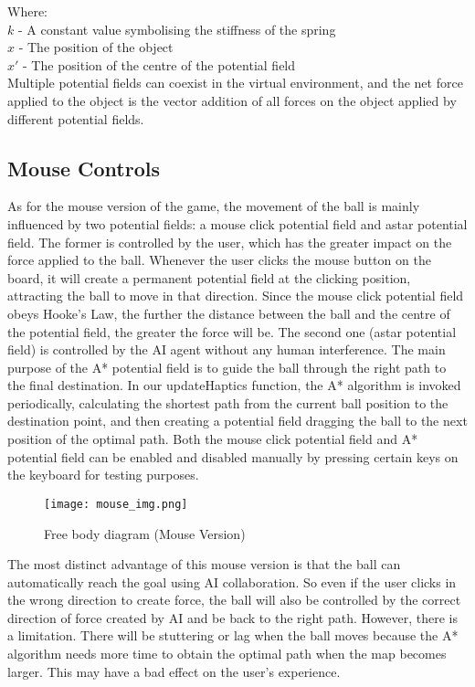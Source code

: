 \documentclass[a4paper]{article}
\begin{document}
\noindent Where: \\
    $k$  - A constant value symbolising the stiffness of the spring\\
    $x$  - The position of the object \\
    $x'$ - The position of the centre of the potential field \\

Multiple potential fields can coexist in the virtual environment, and the net force applied to the object is the vector addition of all forces on the object applied by different potential fields.

\subsection{Mouse Controls}
As for the mouse version of the game, the movement of the ball is mainly influenced by two potential fields: a mouse click potential field and astar potential field. The former is controlled by the user, which has the greater impact on the force applied to the ball. Whenever the user clicks the mouse button on the board, it will create a permanent potential field at the clicking position, attracting the ball to move in that direction. Since the mouse click potential field obeys Hooke’s Law, the further the distance between the ball and the centre of the potential field, the greater the force will be. The second one (astar potential field) is controlled by the AI agent without any human interference. The main purpose of the A* potential field is to guide the ball through the right path to the final destination. In our updateHaptics function, the A* algorithm is invoked periodically, calculating the shortest path from the current ball position to the destination point, and then creating a potential field dragging the ball to the next position of the optimal path. Both the mouse click potential field and A* potential field can be enabled and disabled manually by pressing certain keys on the keyboard for testing purposes.

\begin{figure}[H]
    \centering
    \texttt{[image: mouse\_img.png]}
    \caption{Free body diagram (Mouse Version)}
    \label{fig:mouse_img}
\end{figure}
The most distinct advantage of this mouse version is that the ball can automatically reach the goal using AI collaboration. So even if the user clicks in the wrong direction to create force, the ball will also be controlled by the correct direction of force created by AI and be back to the right path. However, there is a limitation. There will be stuttering or lag when the ball moves because the A* algorithm needs more time to obtain the optimal path when the map becomes larger. This may have a bad effect on the user’s experience.
\end{document}

